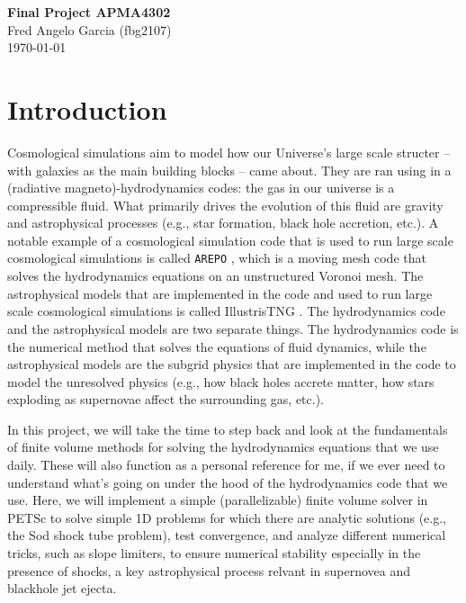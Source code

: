 \documentclass[12pt]{article}
\begin{document}
\begin{flushleft}
\textbf{Final Project APMA4302} \\
Fred Angelo Garcia (fbg2107) \\
\today
\end{flushleft}

\vspace{0.1in}

\section{Introduction}
Cosmological simulations aim to model how our Universe's large scale structer -- with galaxies as the main building blocks -- came about. They are ran using in a (radiative magneto)-hydrodynamics codes: the gas in our universe is a compressible fluid. What primarily drives the evolution of this fluid are gravity and astrophysical processes (e.g., star formation, black hole accretion, etc.). A notable example of a cosmological simulation code that is used to run large scale cosmological simulations is called \texttt{AREPO} \citep{2020ApJS..248...32W}, which is a moving mesh code that solves the hydrodynamics equations on an unstructured Voronoi mesh. The astrophysical models that are implemented in the code and used to run large scale cosmological simulations is called IllustrisTNG \citep{2019ComAC...6....2N}. The hydrodynamics code and the astrophysical models are two separate things. The hydrodynamics code is the numerical method that solves the equations of fluid dynamics, while the astrophysical models are the subgrid physics that are implemented in the code to model the unresolved physics (e.g., how black holes accrete matter, how stars exploding as supernovae affect the surrounding gas, etc.). 

In this project, we will take the time to step back and look at the fundamentals of finite volume methods for solving the hydrodynamics equations that we use daily. These will also function as a personal reference for me, if we ever need to understand what's going on under the hood of the hydrodynamics code that we use. Here, we will implement a simple (parallelizable) finite volume solver in PETSc to solve simple 1D problems for which there are analytic solutions (e.g., the Sod shock tube problem), test convergence, and analyze different numerical tricks, such as slope limiters, to ensure numerical stability especially in the presence of shocks, a key astrophysical process relvant in supernovea and blackhole jet ejecta.
\end{document}
